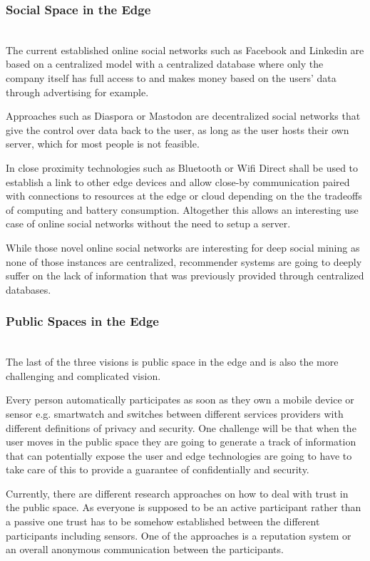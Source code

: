 \subsubsection{Social Space in the Edge}\hspace*{\fill} \\
The current established online social networks such as Facebook and Linkedin are based on a centralized model with a centralized database where only the company itself has full access to and makes money based on the users’ data through advertising for example.

Approaches such as Diaspora or Mastodon are decentralized social networks that give the control over data back to the user, as long as the user hosts their own server, which for most people is not feasible.

In close proximity technologies such as Bluetooth or Wifi Direct shall be used to establish a link to other edge devices and allow close-by communication paired with connections to resources at the edge or cloud depending on the the tradeoffs of computing and battery consumption. Altogether this allows an interesting use case of online social networks without the need to setup a server.

While those novel online social networks are interesting for deep social mining as none of those instances are centralized, recommender systems are going to deeply suffer on the lack of information that was previously provided through centralized databases.

\subsubsection{Public Spaces in the Edge}\hspace*{\fill} \\
The last of the three visions is public space in the edge and is also the more challenging and complicated vision.

Every person automatically participates as soon as they own a mobile device or sensor e.g. smartwatch and switches between different services providers with different definitions of privacy and security.
One challenge will be that when the user moves in the public space they are going to generate a track of information that can potentially expose the user and edge technologies are going to have to take care of this to provide a guarantee of confidentially and security.

Currently, there are different research approaches on how to deal with trust in the public space. As everyone is supposed to be an active participant rather than a passive one trust has to be somehow established between the different participants including sensors.
One of the approaches is a reputation system or an overall anonymous communication between the participants.

